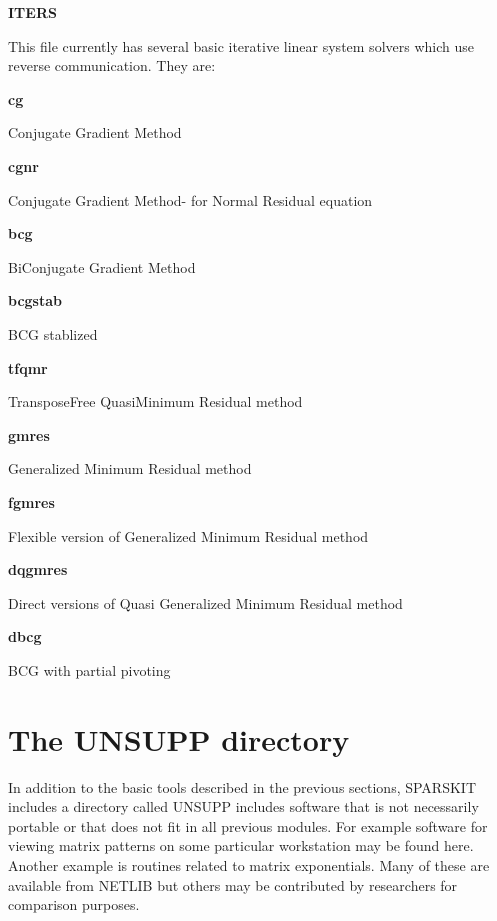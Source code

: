 \documentclass[12pt]{article}
\def\marg#1{\parbox[b]{1.3in}{\bf #1}}
\def\disp#1{\parbox[t]{4.62in}{#1} \vskip 0.2in }
\begin{document}
\marg{ITERS}\disp{This file currently has several basic iterative linear 
 system solvers which use reverse communication. They are:}
\marg{cg}\disp{Conjugate Gradient Method}
\marg{cgnr}\disp{Conjugate Gradient Method\-- for Normal Residual equation}
\marg{bcg}\disp{Bi\-Conjugate Gradient Method}
\marg{bcgstab}\disp{BCG stablized}
\marg{tfqmr}\disp{Transpose\-Free Quasi\-Minimum Residual method}
\marg{gmres}\disp{Generalized Minimum Residual method}
\marg{fgmres}\disp{Flexible version of Generalized Minimum Residual method}
\marg{dqgmres}\disp{Direct versions of Quasi Generalized Minimum Residual
                       method}
\marg{dbcg}\disp{BCG with partial pivoting}


\section{The UNSUPP directory}
In addition to the basic tools described in the previous 
sections, SPARSKIT includes a directory 
called UNSUPP includes software that is not necessarily 
portable or that does not fit in all previous modules.
For example software for viewing matrix patterns on 
some particular workstation
may be found here. Another example is 
routines related to matrix exponentials.
Many of these are available from
NETLIB but others may be contributed by researchers for
comparison purposes.


%
%
\end{document}
